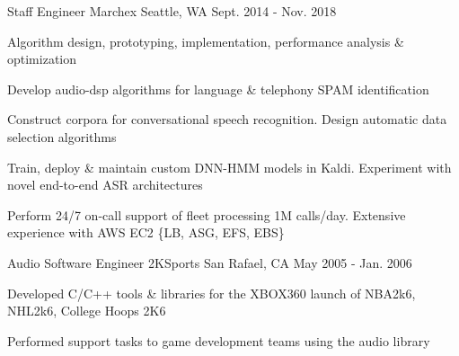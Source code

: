 

\begin{cventries}


  \cventry
    {Staff Engineer} %
    {Marchex} %
    {Seattle, WA} %
    {Sept. 2014 - Nov. 2018} %
    {
      \begin{cvitems} %
        \item {Algorithm design, prototyping, implementation, performance analysis \& optimization}
        \item {Develop audio-dsp algorithms for language \& telephony SPAM identification}
        \item {Construct corpora for conversational speech recognition. Design automatic data selection algorithms}
        \item {Train, deploy \& maintain custom DNN-HMM models in Kaldi. Experiment with novel end-to-end ASR architectures}
        \item {Perform 24/7 on-call support of fleet processing 1M calls/day. Extensive experience with AWS EC2 \{LB, ASG, EFS, EBS\}}
      \end{cvitems}
    }

  \cventry
    {Audio Software Engineer} %
    {2KSports} %
    {San Rafael, CA} %
    {May 2005 - Jan. 2006} %
    {
      \begin{cvitems} %
        \item {Developed C/C++ tools \& libraries for the XBOX360 launch of NBA2k6, NHL2k6, College Hoops 2K6}
        \item {Performed support tasks to game development teams using the audio library}
      \end{cvitems}
    }

\end{cventries}
	